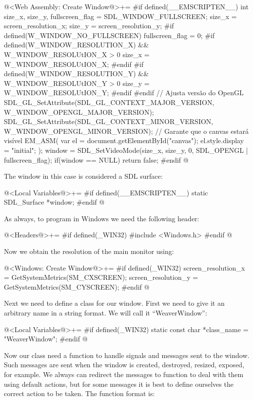 \iniciocodigo
@<Web Assembly: Create Window@>+=
#if defined(__EMSCRIPTEN__)
{
  int size_x, size_y, fullscreen_flag = SDL_WINDOW_FULLSCREEN;
  size_x = screen_resolution_x;
  size_y = screen_resolution_y;
#if defined(W_WINDOW_NO_FULLSCREEN)
  fullscreen_flag = 0;
#if defined(W_WINDOW_RESOLUTION_X) && W_WINDOW_RESOLUtION_X > 0
  size_x = W_WINDOW_RESOLUtION_X;
#endif
#if defined(W_WINDOW_RESOLUTION_Y) && W_WINDOW_RESOLUtION_Y > 0
  size_y = W_WINDOW_RESOLUtION_Y;
#endif
#endif
  // Ajusta versão do OpenGL
  SDL_GL_SetAttribute(SDL_GL_CONTEXT_MAJOR_VERSION,
                     W_WINDOW_OPENGL_MAJOR_VERSION);
  SDL_GL_SetAttribute(SDL_GL_CONTEXT_MINOR_VERSION,
                     W_WINDOW_OPENGL_MINOR_VERSION);
  // Garante que o canvas estará visível
  EM_ASM(
    var el = document.getElementById("canvas");
    el.style.display = "initial";
  );
  window = SDL_SetVideoMode(size_x, size_y, 0,
                            SDL_OPENGL | fullscreen_flag);
  if(window == NULL)
    return false;
}
#endif
@
\fimcodigo

The window in this case is considered a SDL surface:

\iniciocodigo
@<Local Variables@>+=
#if defined(__EMSCRIPTEN__)
static SDL_Surface *window;
#endif
@
\fimcodigo


As always, to program in Windows we need the following header:

\iniciocodigo
@<Headers@>+=
#if defined(_WIN32)
#include <Windows.h>
#endif
@
\fimcodigo

Now we obtain the resolution of the main monitor using:

\iniciocodigo
@<Windows: Create Window@>+=
#if defined(_WIN32)
screen_resolution_x = GetSystemMetrics(SM_CXSCREEN);
screen_resolution_y = GetSystemMetrics(SM_CYSCREEN);
#endif
@
\fimcodigo

Next we need to define a class for our window. First we need to give
it an arbitrary name in a string format. We will call it
``WeaverWindow'':

\iniciocodigo
@<Local Variables@>+=
#if defined(_WIN32)
static const char *class_name = "WeaverWindow";
#endif
@
\fimcodigo

Now our class need a function to handle signals and messages sent to
the window. Such messages are sent when the window is created,
destroyed, resized, exposed, for example. We always can redirect the
messages to function  to deal with them
using default actions, but for some messages it is best to define
ourselves the correct action to be taken. The function format is:

